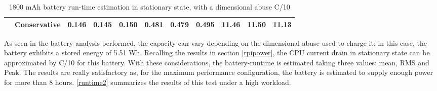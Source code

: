 \begin{table}[H]
\begin{tabular}{ccccccccccc}
\multicolumn{1}{c|}{}  & Conservative                     & 0.146                     & 0.145                     & \multicolumn{1}{c|}{{\color[HTML]{FE0000} 0.150}} & 0.481                     & 0.479                     & \multicolumn{1}{c|}{{\color[HTML]{FE0000} 0.495}} & 11.46                     & 11.50                     & {\color[HTML]{FE0000} 11.13}                     \\ \hline
\end{tabular}
\caption{1800 mAh battery run-time estimation in stationary state, with a dimensional abuse C/10}
\label{runtime1}
\end{table}
\vspace{-0.8cm}


As seen in the battery analysis performed, the capacity can vary depending on the dimensional abuse used to charge it; in this case, the battery exhibits a stored energy of 5.51 Wh. Recalling the results in section \ref{rpipower}, the \acrshort{CPU} current drain in stationary state can be approximated by C/10 for this battery. With these considerations, the battery-runtime is estimated taking three values: mean, \acrshort{RMS} and Peak. The results are really satisfactory as, for the maximum performance configuration, the battery is estimated to supply enough power for more than 8 hours. \autoref{runtime2} summarizes the results of this test under a high workload.


